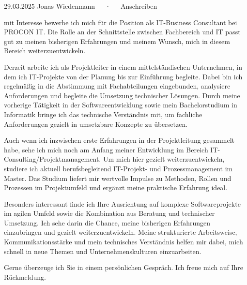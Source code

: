 \documentclass[11pt, a4paper]{awesome-cv}
\begin{document}
\makecvheader[R]

\makecvfooter
  {29.03.2025}
  {Jonas Wiedenmann~~~·~~~Anschreiben}
  {}

\makelettertitle

\begin{cvletter}

mit Interesse bewerbe ich mich für die Position als IT-Business Consultant bei PROCON IT. Die Rolle an der Schnittstelle zwischen Fachbereich und IT passt gut zu meinen bisherigen Erfahrungen und meinem Wunsch, mich in diesem Bereich weiterzuentwickeln.

Derzeit arbeite ich als Projektleiter in einem mittelständischen Unternehmen, in dem ich IT-Projekte von der Planung bis zur Einführung begleite. Dabei bin ich regelmäßig in die Abstimmung mit Fachabteilungen eingebunden, analysiere Anforderungen und begleite die Umsetzung technischer Lösungen. Durch meine vorherige Tätigkeit in der Softwareentwicklung sowie mein Bachelorstudium in Informatik bringe ich das technische Verständnis mit, um fachliche Anforderungen gezielt in umsetzbare Konzepte zu übersetzen.

Auch wenn ich inzwischen erste Erfahrungen in der Projektleitung gesammelt habe, sehe ich mich noch am Anfang meiner Entwicklung im Bereich IT-Consulting/Projektmanagement. Um mich hier gezielt weiterzuentwickeln, studiere ich aktuell berufsbegleitend IT-Projekt- und Prozessmanagement im Master. Das Studium liefert mir wertvolle Impulse zu Methoden, Rollen und Prozessen im Projektumfeld und ergänzt meine praktische Erfahrung ideal.

Besonders interessant finde ich Ihre Ausrichtung auf komplexe Softwareprojekte im agilen Umfeld sowie die Kombination aus Beratung und technischer Umsetzung. Ich sehe darin die Chance, meine bisherigen Erfahrungen einzubringen und gezielt weiterzuentwickeln. Meine strukturierte Arbeitsweise, Kommunikationsstärke und mein technisches Verständnis helfen mir dabei, mich schnell in neue Themen und Unternehmenskulturen einzuarbeiten.

Gerne überzeuge ich Sie in einem persönlichen Gespräch. Ich freue mich auf Ihre Rückmeldung.

\end{cvletter}


\makeletterclosing
\end{document}
